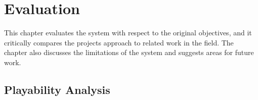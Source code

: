 \chapter{Evaluation}
\label{chapter:evaluation}

This chapter evaluates the system with respect to the original objectives, and it critically compares the projects approach to related work in the field. The chapter also discusses the limitations of the system and suggests areas for future work.

\section{Playability Analysis}






